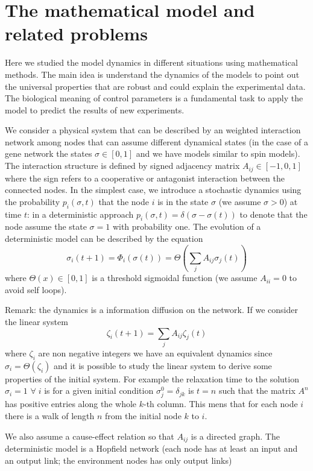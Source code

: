 \section{The mathematical model and related problems}
Here we studied the model dynamics in different situations using mathematical methods. The main idea is understand the dynamics of the models to point
out the universal properties that are robust and could explain the experimental data. The biological meaning of control parameters is a fundamental task
to apply the model to predict the results of new experiments.\par\noindent 
We consider a physical system that can be described by an weighted interaction network among nodes that can assume different
dynamical states (in the case of a gene network the states $\sigma\in [0,1]$ and we have models similar to spin models).
The interaction structure is defined by signed adjacency matrix $A_{ij}\in[-1,0,1]$ where the sign refers to a cooperative or antagonist interaction between the connected nodes. 
In the simplest case, we introduce a stochastic dynamics using the probability $p_i(\sigma, t)$ that the node $i$ is in the state 
$\sigma$ (we assume $\sigma>0$) at time $t$: in a deterministic approach $p_i(\sigma, t)=\delta(\sigma-\sigma(t))$
to denote that the node assume the state $\sigma=1$ with probability one. The evolution of a deterministic model
can be described by the equation
\begin{equation}
\sigma_i(t+1)=\Phi_i(\sigma(t))=\Theta\left (\sum_j A_{ij}\sigma_j(t)\right )
\label{evolnet}
\end{equation}
where $\Theta(x)\in[0,1]$ is a threshold sigmoidal function (we assume $A_{ii}=0$ to avoid self loops). \par\noindent
Remark: the dynamics is a information diffusion on the network. If we consider the linear system
$$
\zeta_i(t+1)=\sum_j A_{ij}\zeta_j(t)
$$
where $\zeta_i$ are non negative integers we have an equivalent dynamics since $\sigma_i=\Theta(\zeta_i)$ and it is possible
to study the linear system to derive some properties of the initial system. For example the relaxation time to the solution $\sigma_i=1$
$\forall\; i$ is for a given initial condition $\sigma^0_j=\delta_{jk}$ is $t=n$ such that the matrix $A^n$ has positive entries along the whole
$k$-th column. This mens that for each node $i$ there is a walk of length $n$ from the initial node $k$ to $i$.
\par\noindent
We also assume a cause-effect relation so that $A_{ij}$ is a directed
graph. The deterministic model is a Hopfield network (each node has at least an input and an output link; the environment nodes has only output links)
